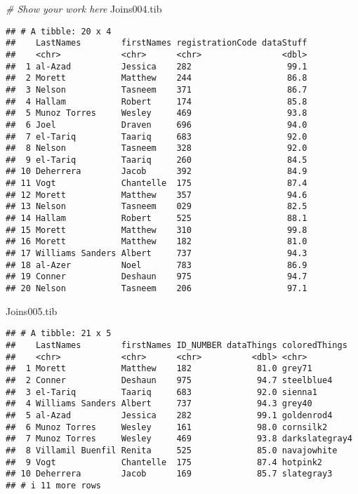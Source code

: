 \documentclass[
]{article}
\newenvironment{Shaded}{\begin{snugshade}}{\end{snugshade}}
\newcommand{\CommentTok}[1]{\textcolor[rgb]{0.56,0.35,0.01}{\textit{#1}}}
\newcommand{\NormalTok}[1]{#1}
\begin{document}
\begin{Shaded}
\begin{Highlighting}[]
\CommentTok{\# Show your work here}
\NormalTok{Joins004.tib}
\end{Highlighting}
\end{Shaded}

\begin{verbatim}
## # A tibble: 20 x 4
##    LastNames        firstNames registrationCode dataStuff
##    <chr>            <chr>      <chr>                <dbl>
##  1 al-Azad          Jessica    282                   99.1
##  2 Morett           Matthew    244                   86.8
##  3 Nelson           Tasneem    371                   86.7
##  4 Hallam           Robert     174                   85.8
##  5 Munoz Torres     Wesley     469                   93.8
##  6 Joel             Draven     696                   94.0
##  7 el-Tariq         Taariq     683                   92.0
##  8 Nelson           Tasneem    328                   92.0
##  9 el-Tariq         Taariq     260                   84.5
## 10 Deherrera        Jacob      392                   84.9
## 11 Vogt             Chantelle  175                   87.4
## 12 Morett           Matthew    357                   94.6
## 13 Nelson           Tasneem    029                   82.5
## 14 Hallam           Robert     525                   88.1
## 15 Morett           Matthew    310                   99.8
## 16 Morett           Matthew    182                   81.0
## 17 Williams Sanders Albert     737                   94.3
## 18 al-Azer          Noel       783                   86.9
## 19 Conner           Deshaun    975                   94.7
## 20 Nelson           Tasneem    206                   97.1
\end{verbatim}

\begin{Shaded}
\begin{Highlighting}[]
\NormalTok{Joins005.tib}
\end{Highlighting}
\end{Shaded}

\begin{verbatim}
## # A tibble: 21 x 5
##    LastNames        firstNames ID_NUMBER dataThings coloredThings 
##    <chr>            <chr>      <chr>          <dbl> <chr>         
##  1 Morett           Matthew    182             81.0 grey71        
##  2 Conner           Deshaun    975             94.7 steelblue4    
##  3 el-Tariq         Taariq     683             92.0 sienna1       
##  4 Williams Sanders Albert     737             94.3 grey40        
##  5 al-Azad          Jessica    282             99.1 goldenrod4    
##  6 Munoz Torres     Wesley     161             98.0 cornsilk2     
##  7 Munoz Torres     Wesley     469             93.8 darkslategray4
##  8 Villamil Buenfil Renita     525             85.0 navajowhite   
##  9 Vogt             Chantelle  175             87.4 hotpink2      
## 10 Deherrera        Jacob      169             85.7 slategray3    
## # i 11 more rows
\end{verbatim}
\end{document}
